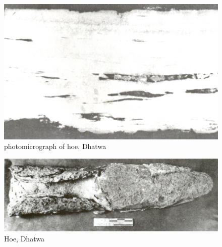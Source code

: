 \begin{figure}[H]
\renewcommand{\thefigure}{17A}
\includegraphics[scale=1.1]{images/chapter-4/fig017A.jpg}
\caption{photomicrograph of hoe, Dhatwa}\label{chapter-4-fig17A}
\end{figure}
\begin{figure}[H]
\renewcommand{\thefigure}{17B}
\includegraphics[scale=1.1]{images/chapter-4/fig017B.jpg}
\caption{Hoe, Dhatwa}\label{chapter-4-fig17B}
\end{figure}

\newpage

